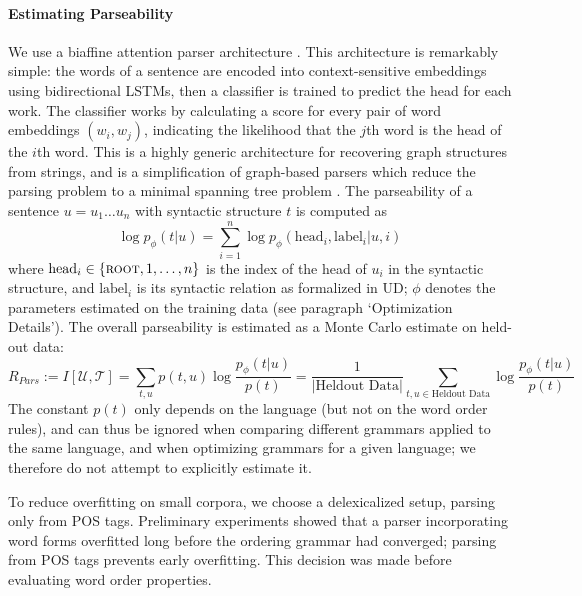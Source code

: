 \documentclass[10pt,twoside,lineno]{article}
\newcommand{\utterance}{\mathcal{U}}
\newcommand{\tree}{\mathcal{T}}
\begin{document}
\paragraph{Estimating Parseability}
We use a biaffine attention parser architecture \citep{kiperwasser2016simple,zhang2017dependency,dozat2017stanford}. This architecture is remarkably simple: the words of a sentence are encoded into context-sensitive embeddings using bidirectional LSTMs, then a classifier is trained to predict the head for each work. The classifier works by calculating a score for every pair of word embeddings $(w_i, w_j)$, indicating the likelihood that the $j$th word is the head of the $i$th word. This is a highly generic architecture for recovering graph structures from strings, and is a simplification of graph-based parsers which reduce the parsing problem to a minimal spanning tree problem \citep{mcdonald2005nonprojective}.
The parseability of a sentence $u = u_1\dots u_n$ with syntactic structure $t$ is computed as
\begin{equation}
	\log p_\phi(t|u) = \sum_{i=1}^n \log p_\phi(\text{head}_i, \text{label}_i | u, i)
\end{equation}
where $\text{head}_i \in \{\textsc{root}, 1,\dots,n\}$ is the index of the head of $u_i$ in the syntactic structure, and $\text{label}_i$ is its syntactic relation as formalized in UD; $\phi$ denotes the parameters estimated on the training data (see paragraph `Optimization Details').
The overall parseability is estimated as a Monte Carlo estimate on held-out data:
\begin{equation}\label{eq:rpars}
	R_{Pars} := I[\utterance,\tree] = \sum_{t,u} p(t,u) \log \frac{p_\phi(t|u)}{p(t)} = \frac{1}{|\text{Heldout Data}|} \sum_{t,u \in \text{Heldout Data}} \log \frac{p_\phi(t|u)}{p(t)}
\end{equation}
The constant $p(t)$ only depends on the language (but not on the word order rules), and can thus be ignored when comparing different grammars applied to the same language, and when optimizing grammars for a given language; we therefore do not attempt to explicitly estimate it.


To reduce overfitting on small corpora, we choose a delexicalized setup, parsing only from POS tags. Preliminary experiments showed that a parser incorporating word forms overfitted long before the ordering grammar had converged; parsing from POS tags prevents early overfitting.
This decision was made before evaluating word order properties.
\end{document}
